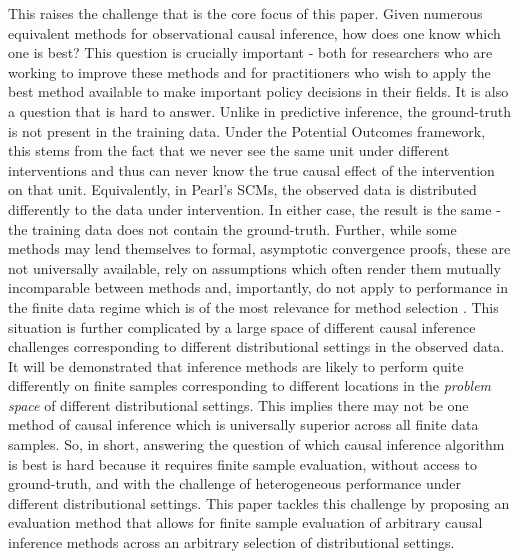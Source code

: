 \documentclass[../main.tex]{subfiles}
\begin{document}
\vspace{\baselineskip}
This raises the challenge that is the core focus of this paper. Given numerous equivalent methods for observational causal inference, how does one know which one is best? This question is crucially important - both for researchers who are working to improve these methods and for practitioners who wish to apply the best method available to make important policy decisions in their fields. It is also a question that is hard to answer. Unlike in predictive inference, the ground-truth is not present in the training data. Under the Potential Outcomes framework, this stems from the fact that we never see the same unit under different interventions and thus can never know the true causal effect of the intervention on that unit. Equivalently, in Pearl’s SCMs, the observed data is distributed differently to the data under intervention. In either case, the result is the same - the training data does not contain the ground-truth. Further, while some methods may lend themselves to formal, asymptotic convergence proofs, these are not universally available, rely on assumptions which often render them mutually incomparable between methods and, importantly, do not apply to performance in the finite data regime which is of the most relevance for method selection \parencite{Knaus2018MachineEvidence}. This situation is further complicated by a large space of different causal inference challenges corresponding to different distributional settings in the observed data. It will be demonstrated that inference methods are likely to perform quite differently on finite samples corresponding to different locations in the \textit{problem space }of different distributional settings. This implies there may not be one method of causal inference which is universally superior across all finite data samples. So, in short, answering the question of which causal inference algorithm is best is hard because it requires finite sample evaluation, without access to ground-truth, and with the challenge of heterogeneous performance under different distributional settings. This paper tackles this challenge by proposing an evaluation method that allows for finite sample evaluation of arbitrary causal inference methods across an arbitrary selection of distributional settings.\par
\end{document}
